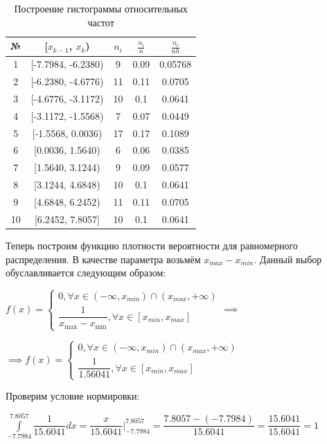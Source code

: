 \documentclass[a4paper, 12pt]{article}
\begin{document}
	\begin{table}[h!]
		\centering
		\begin{tabular}{|c|c|c|c|c|}
			\hline
			№ & [$x_{k-1}$, $x_k$) & $n_i$ & $\frac{n_i}{n}$ & $\frac{n_i}{nh}$ \\
			\hline
			1 & [-7.7984, -6.2380) & 9 & 0.09 & 0.05768 \\
			2 & [-6.2380, -4.6776) &11 & 0.11 & 0.0705 \\
			3 & [-4.6776, -3.1172) & 10 & 0.1 & 0.0641 \\
			4 & [-3.1172, -1.5568) & 7 & 0.07 & 0.0449 \\
			5 & [-1.5568, 0.0036) & 17 & 0.17 & 0.1089 \\
			6 & [0.0036, 1.5640) &6 & 0.06 & 0.0385 \\
			7 & [1.5640, 3.1244) & 9 & 0.09 & 0.0577 \\
			8 & [3.1244, 4.6848) & 10 & 0.1 & 0.0641 \\
			9 & [4.6848, 6.2452) & 11 & 0.11 & 0.0705 \\
			10 & [6.2452, 7.8057] & 10 & 0.1 & 0.0641 \\
			\hline
		\end{tabular}
		\caption{Построение гистограммы относительных частот}
	\end{table}

	\quad Теперь построим функцию плотности вероятности для равномерного распределения. В качестве параметра возьмём $x_{max} - x_{min}$. Данный выбор обуславливается следующим образом:
	
	\begin{center}
	
		$f(x) =
			\begin{cases} 
				0, \forall x \in (-\infty, x_{min}) \cap (x_{max}, +\infty)\\
				 \dfrac{1}{x_{\text{max}} - x_{\text{min}}}, \forall x \in [x_{min}, x_{max}]
			\end{cases} \implies$
			
			$\implies f(x) = 
			\begin{cases}
				0, \forall x \in (-\infty, x_{min}) \cap (x_{max}, +\infty) \\
				\dfrac{1}{1.56041}, \forall x \in [x_{min}, x_{max}]
			\end{cases}$
			
	
		Проверим условие нормировки:
		
		$ \displaystyle\int\limits_{-7.7984}^{7.8057} {\dfrac{1}{15.6041}} dx = \dfrac{x}{15.6041} \bigg|_{-7.7984}^{7.8057} = \dfrac{7.8057 - (-7.7984)}{15.6041} = \dfrac{15.6041}{15.6041} = 1$
	\end{center}
	
\end{document}

